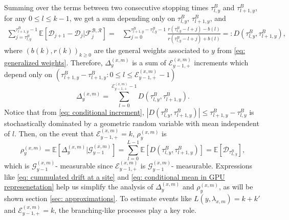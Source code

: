 \documentclass[twoside,12pt,a4paper]{article}
\numberwithin{equation}{section}
\newcommand{\abs}[1]{\left\vert #1 \right\vert}
\newcommand{\edt}[1]{\textcolor{red}{#1}} %
\begin{document}
		Summing over the terms between two consecutive stopping times $\tau^{B}_{l,y} $ and $\tau^{B}_{l+1,y} $, for any $0\leq l \leq k -1$,  we get a sum depending only on $\tau^{B}_{l,y} $, $\tau^{B}_{l+1,y} $, and 
		\begin{align} \label{eq: conditional increment}
		 	\sum_{j=\tau^{B}_{l,y}}^{\tau^B_{l+1,y}-1} \mathbb{E}\left[ \mathcal{D}_{j+1} - \mathcal{D}_{j}  \vert \mathcal{F}^{\mathcal{B},\mathcal{R}}_{j} \right] =&
		 	 \sum_{j=0}^{\tau^B_{l+1,y}-\tau^{B}_{l,y}-1} \frac{ r(\tau^{B}_{l,y}-l + j) - b(l)  }{ r(\tau^{B}_{l,y}-l + j) + b(l)  } 
		 	 =:  D(\tau^{B}_{l,y},\tau^{B}_{l+1,y} ),
		\end{align}   
		where $(b(k),r(k))_{k\geq 0}$ are the general weights associated to $y$ from \edt{\eqref{eq: generalized weights}}.
		Therefore,  $\Delta_{y}^{(x,m)}$ is a sum of $\mathcal{E}^{(x,m)}_{y-1,+} $ increments which depend only on $ \left(\tau^{B}_{l+1,y} - \tau^{B}_{l+1,y}: 0\leq l\leq   \mathcal{E}^{(x,m)}_{y-1,+}-1 \right) $
				\begin{equation} \label{eq: cummulated drift at a site}
					\Delta_{y}^{(x,m)} = \sum_{l=0 }^{ \mathcal{E}^{(x,m)}_{y-1,+} -1  } D(\tau^{B}_{l,y},\tau^{B}_{l+1,y} ).
				\end{equation}			
		Notice that from \eqref{eq: conditional increment}, $\abs{  D(\tau^{B}_{l,y},\tau^{B}_{l+1,y} )} \leq  \tau^{B}_{l+1,y}-\tau^{B}_{l,y}$ is stochastically dominated by a geometric random variable with mean independent of $l$. 
		Then, on the event that $ \mathcal{E}^{(x,m)}_{y-1,+} = k $, $ \rho_{y}^{(x,m)} $ is
		\begin{equation}\label{eq: conditional mean in GPU represenetation}
			\rho_{y}^{(x,m)} = \mathbb{E}\left[\Delta_{y}^{(x,m)} \vert \mathcal{G}_{y-1}^{(x,m)}\right] = \sum_{l=0 }^{ L -1  } \mathbb{E}\left[ D(\tau^{B}_{l,y},\tau^{B}_{l+1,y} ) \right] = \mathbb{E}\left[ \mathcal{D}_{\tau^{B}_{L,y}} \right],
		\end{equation} which is $\mathcal{G}_{y-1}^{(x,m)}$- measurable since $\mathcal{E}^{(x,m)}_{y-1,+} $ is $\mathcal{G}_{y-1}^{(x,m)}$- measurable. 
		Expressions like \eqref{eq: cummulated drift at a site} and \eqref{eq: conditional mean in GPU represenetation} help us simplify the analysis of $\Delta_{y}^{(x,m)}$ and $\rho_{y}^{(x,m)}$, as will be shown section \ref{sec: approximations}. To estimate events like $ L(y,\lambda_{x,m}) = k+k'$ and $\mathcal{E}^{(x,m)}_{y-1,+} = k $, the branching-like processes play a key role. 
		
		
\end{document}
